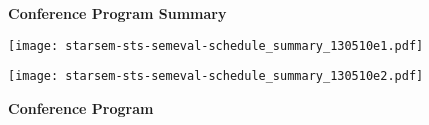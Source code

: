 \setlength{\parindent}{0in}
\setlength{\parskip}{2ex}
\renewcommand{\baselinestretch}{0.87}


\begin{center}
{\Large \bf
  Conference Program Summary
}
\end{center}
\vspace{-10mm}
\graphicspath{{./}{../templates/}{../templates/logo/}}
\texttt{[image: starsem-sts-semeval-schedule\_summary\_130510e1.pdf]}
\newpage
\graphicspath{{./}{../templates/}{../templates/logo/}}
\texttt{[image: starsem-sts-semeval-schedule\_summary\_130510e2.pdf]}
\newpage



\begin{center}
{\Large \bf
  Conference Program
}
\end{center}
\vspace{3mm}
